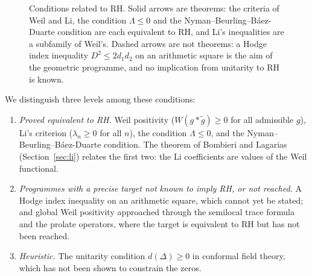 \documentclass[11pt]{amsart}
\theoremstyle{definition}
\theoremstyle{remark}
\begin{document}
\begin{figure}[ht]
\centering
{}
\caption{Conditions related to RH. Solid arrows are theorems: the criteria of Weil and Li, the condition $\Lambda\le0$ and the Nyman--Beurling--B\'aez-Duarte condition are each equivalent to RH, and Li's inequalities are a subfamily of Weil's. Dashed arrows are not theorems: a Hodge index inequality $D^2\le 2d_1d_2$ on an arithmetic square is the aim of the geometric programme, and no implication from unitarity to RH is known.}
\label{fig:positivity}
\end{figure}

We distinguish three levels among these conditions:
\begin{enumerate}[label=(\roman*)]
\item \emph{Proved equivalent to RH.} Weil positivity ($W(g * \tilde{g}) \ge 0$ for all admissible $g$), Li's criterion ($\lambda_n \ge 0$ for all $n$), the condition $\Lambda\le0$, and the Nyman--Beurling--B\'aez-Duarte condition. The theorem of Bombieri and Lagarias (Section~\ref{sec:li}) relates the first two: the Li coefficients are values of the Weil functional.
\item \emph{Programmes with a precise target not known to imply RH, or not reached.} A Hodge index inequality on an arithmetic square, which cannot yet be stated; and global Weil positivity approached through the semilocal trace formula and the prolate operators, where the target is equivalent to RH but has not been reached.
\item \emph{Heuristic.} The unitarity condition $d(\Delta) \ge 0$ in conformal field theory, which has not been shown to constrain the zeros.
\end{enumerate}
\end{document}
